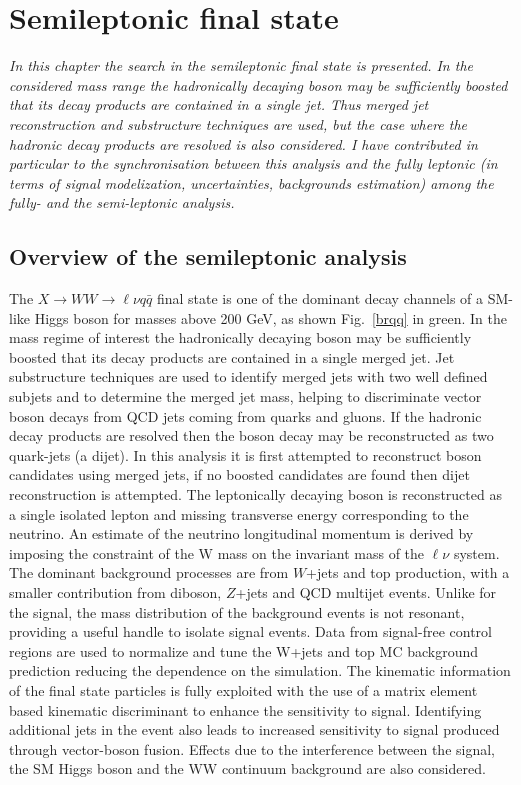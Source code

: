 \chapter{Semileptonic final state}
\label{cap6}

\textit{In this chapter the search in the semileptonic final state is
  presented. In the considered mass range the hadronically decaying
  boson may be sufficiently boosted that its decay products are
  contained in a single jet. Thus merged jet
reconstruction and substructure techniques are used, but the case where the hadronic
decay products are resolved is also considered. I have contributed in
particular to 
the synchronisation between this analysis and the fully leptonic (in terms of signal modelization, uncertainties, 
backgrounds estimation) among the fully- and the semi-leptonic analysis. }

\section{Overview of the semileptonic analysis}
The $X \to WW \to \ell \nu q \bar{q}$ final state is one of the
dominant decay channels of a SM-like Higgs boson for masses above 200
GeV, as shown Fig.~\ref{brqq} in green.
In the mass regime of interest the hadronically decaying boson may be sufficiently boosted that
its decay products are contained in a single merged jet. Jet substructure techniques are used
to identify merged jets with two well defined subjets and to determine the merged jet mass,
helping to discriminate vector boson decays from QCD jets coming from quarks and gluons. If
the hadronic decay products are resolved then the boson decay may be reconstructed as two
quark-jets (a dijet). In this analysis it is first attempted to reconstruct boson candidates using
merged jets, if no boosted candidates are found then dijet reconstruction is attempted.
The leptonically decaying boson is reconstructed as a single isolated lepton and missing transverse energy
corresponding to the neutrino. An estimate of the neutrino longitudinal
momentum is derived by imposing the constraint of the W mass on the invariant mass of the $\ell \nu$ system.
The dominant background processes
are from $W$+jets and top production, with a smaller contribution from diboson, $Z$+jets and
QCD multijet events. Unlike for the signal, the mass distribution of the background events is
not resonant, providing a useful handle to isolate signal events. Data from signal-free control
regions are used to normalize and tune the W+jets and top MC background prediction reducing
the dependence on the simulation.
The kinematic information of the final state particles is fully exploited with the use of a matrix
element based kinematic discriminant to enhance the sensitivity to signal. Identifying additional jets in the event also leads to increased sensitivity to signal produced through vector-boson fusion. Effects due to the interference between the signal, the SM Higgs boson and the WW continuum background are also considered.

